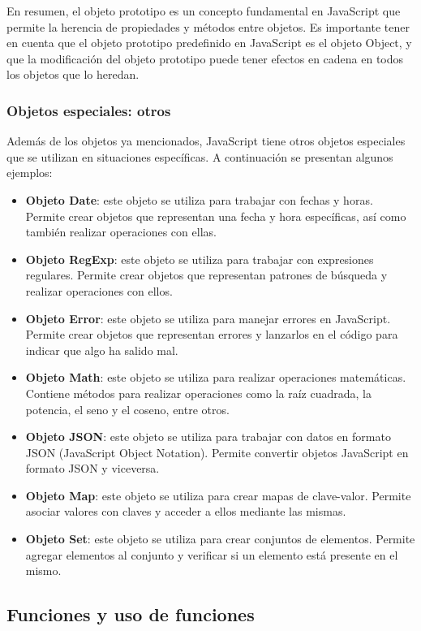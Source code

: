 \documentclass[executivepaper]{article}
\begin{document}
En resumen, el objeto prototipo es un concepto fundamental en JavaScript que permite la herencia de propiedades y métodos entre objetos. Es importante tener en cuenta que el objeto prototipo predefinido en JavaScript es el objeto Object, y que la modificación del objeto prototipo puede tener efectos en cadena en todos los objetos que lo heredan.

\subsubsection*{Objetos especiales: otros}
Además de los objetos ya mencionados, JavaScript tiene otros objetos especiales que se utilizan en situaciones específicas. A continuación se presentan algunos ejemplos:
\begin{itemize}
    \item \textbf{Objeto Date}: este objeto se utiliza para trabajar con fechas y horas. Permite crear objetos que representan una fecha y hora específicas, así como también realizar operaciones con ellas.

    \item \textbf{Objeto RegExp}: este objeto se utiliza para trabajar con expresiones regulares. Permite crear objetos que representan patrones de búsqueda y realizar operaciones con ellos.
    
    \item \textbf{Objeto Error}: este objeto se utiliza para manejar errores en JavaScript. Permite crear objetos que representan errores y lanzarlos en el código para indicar que algo ha salido mal.
    
    \item \textbf{Objeto Math}: este objeto se utiliza para realizar operaciones matemáticas. Contiene métodos para realizar operaciones como la raíz cuadrada, la potencia, el seno y el coseno, entre otros.
    
    \item \textbf{Objeto JSON}: este objeto se utiliza para trabajar con datos en formato JSON (JavaScript Object Notation). Permite convertir objetos JavaScript en formato JSON y viceversa.
    
    \item \textbf{Objeto Map}: este objeto se utiliza para crear mapas de clave-valor. Permite asociar valores con claves y acceder a ellos mediante las mismas.
    
    \item \textbf{Objeto Set}: este objeto se utiliza para crear conjuntos de elementos. Permite agregar elementos al conjunto y verificar si un elemento está presente en el mismo.
\end{itemize}

\subsection{Funciones y uso de funciones}
\end{document}
